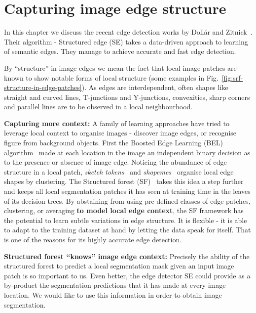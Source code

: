 \chapter{Capturing image edge structure} %
\label{Chapter2}
In this chapter we discuss the recent edge detection works by Doll\'ar and Zitnick~\cite{DollarICCV13edges,Dollar2015PAMI}. Their algorithm - Structured edge (SE) takes a data-driven approach to learning of semantic edges. %
They manage to achieve accurate and fast edge detection. %

By ``structure'' in image edges %
we mean the fact that local image patches are known \cite{Ren2006figure,LimZD13} to show %
notable %
forms of local structure (some examples in Fig.~\ref{fig:srf-structure-in-edge-patches}). As edges are interdependent, often shapes like straight and curved lines, T-junctions and Y-junctions, convexities, sharp corners and parallel lines are to be observed in a local neighbourhood.

\textbf{Capturing more context:} A family of learning approaches have tried to leverage local context to organise images - discover image edges, or recognise %
figure from background objects. First the Boosted Edge Learning (BEL) algorithm~\cite{dollar2006supervised} made at each location in the image an independent binary decision as to the presence or absence of image edge. Noticing the abundance of edge structure in a local patch, \textit{sketch tokens}~\cite{LimZD13} and \textit{shapemes}~\cite{Ren2006figure} organise local edge shapes by clustering. 
The Structured forest (SF)~\cite{DollarICCV13edges} takes this idea a step further and keeps all local segmentation patches it has seen at training time in the leaves of its decision trees. By abstaining from using pre-defined classes of edge patches, clustering, or averaging \textbf{to model local edge context}, the SF framework has the potential to learn subtle variations in edge structure. It is flexible - it is able to adapt to the training dataset at hand by letting the data speak for itself. That is one of the reasons for its highly accurate edge detection.

\textbf{Structured forest ``knows'' image edge context:} Precisely the ability of the structured forest to predict a local segmentation mask given an input image patch is so important to us. Even better, the edge detector SE could provide as a by-product the segmentation predictions that it has made at every image location. We would like to use this information in order to obtain image segmentation.

